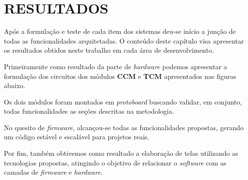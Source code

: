 
\chapter{RESULTADOS}
\label{chap:resultados}


Após a formulação e teste de cada item dos sistemas deu-se início a junção de todas as funcionalidades arquitetadas. O conteúdo deste capítulo visa apresentar os resultados obtidos neste trabalho em cada área de desenvolvimento.

Primeiramente como resultado da parte de \textit{hardware} podemos apresentar a formulação dos circuitos dos módulos \textbf{CCM} e \textbf{TCM} apresentados nas figuras abaixo.

Os dois módulos foram montados em \textit{protoboard} buscando validar, em conjunto, todas funcionalidades as seções descritas na metodologia.

No quesito de \textit{firmware}, alcançou-se todas as funcionalidades propostas, gerando um código estável e escalável para projetos reais.

Por fim, também obtivemos como resultado a elaboração de telas utilizando as tecnologias propostas, atingindo o objetivo de relacionar o \textit{software} com as camadas de \textit{firmware} e \textit{hardware}. 